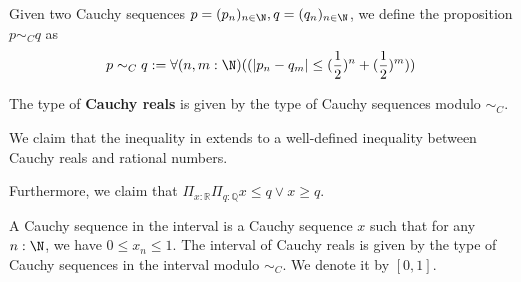 \begin{definition}
Given two Cauchy sequences $p = (p_n)_{n\in\N}, q=(q_n)_{n\in\N}$, 
we define the proposition $p \sim_C  q$ as 
\begin{equation}
  p \sim_C q : = \forall (n,m : \N) ((| p_n - q_m| \leq  (\frac12)^n + (\frac12)^m))
\end{equation}
\end{definition}


\begin{definition}
  The type of \textbf{Cauchy reals} is given by 
  the type of Cauchy sequences modulo $\sim_C$.
\end{definition}

We claim that the inequality in  extends to a well-defined 
inequality between Cauchy reals and rational numbers. 

Furthermore, we claim that 
$\Pi_{x:\mathbb R} \Pi_{q:\mathbb Q} x \leq q \vee x \geq q$. 

%

\begin{definition}
  A Cauchy sequence in the interval is a Cauchy sequence $x$ such that 
  for any $n:\N$, we have $0\leq x_n \leq 1$. 
  The interval of Cauchy reals is given by the type of Cauchy sequences in the interval 
  modulo $\sim_C$. We denote it by $[0,1]$. 
\end{definition}  


